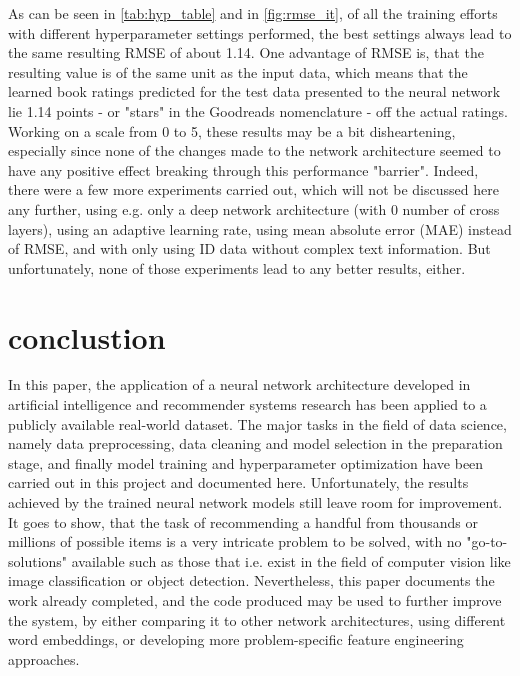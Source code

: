 \documentclass[10pt,final,journal,a4paper,oneside,twocolumn]{IEEEtran}
\begin{document}
As can be seen in \autoref{tab:hyp_table} and in \autoref{fig:rmse_it}, of all the training efforts with different hyperparameter settings performed, the best settings always lead to the same resulting RMSE of about 1.14.
One advantage of RMSE is, that the resulting value is of the same unit as the input data, which means that the learned book ratings predicted for the test data presented to the neural network lie 1.14 points - or "stars" in the Goodreads nomenclature - off the actual ratings.
Working on a scale from 0 to 5, these results may be a bit disheartening, especially since none of the changes made to the network architecture seemed to have any positive effect breaking through this performance "barrier". Indeed, there were a few more experiments carried out, which will not be discussed here any further, using e.g. only a deep network architecture (with 0 number of cross layers), using an adaptive learning rate, using mean absolute error (MAE) instead of RMSE, and with only using ID data without complex text information. But unfortunately, none of those experiments lead to any better results, either.


\section{conclustion}
In this paper, the application of a neural network architecture developed in artificial intelligence and recommender systems research has been applied to a publicly available real-world dataset.
The major tasks in the field of data science, namely data preprocessing, data cleaning and model selection in the preparation stage, and finally model training and hyperparameter optimization have been carried out in this project and documented here.
Unfortunately, the results achieved by the trained neural network models still leave room for improvement. It goes to show, that the task of recommending a handful from thousands or millions of possible items is a very intricate problem to be solved, with no "go-to-solutions" available such as those that i.e. exist in the field of computer vision like image classification or object detection. 
Nevertheless, this paper documents the work already completed, and the code produced may be used to further improve the system, by either comparing it to other network architectures, using different word embeddings, or developing more problem-specific feature engineering approaches.
\end{document}
